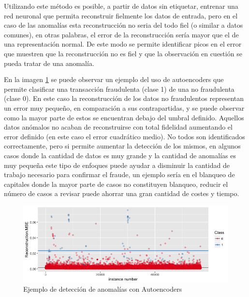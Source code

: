 Utilizando este método es posible, a partir de datos sin etiquetar, entrenar una red neuronal que permita reconstruir fielmente los datos de entrada, pero en el caso de las anomalías esta reconstrucción no seria del todo fiel (o similar a datos comunes), en otras palabras, el error de la reconstrucción sería mayor que el de una representación normal. De este modo se permite identificar picos en el error que muestren que la reconstrucción no es fiel y que la observación en cuestión se pueda tratar de una anomalía.

En la imagen \ref{fig:autoencoderAnomaly} se puede observar un ejemplo del uso de autoencoders que permite clasificar una transacción fraudulenta (clase 1) de una no fraudulenta (clase 0). En este caso la reconstrucción de los datos no fraudulentos representan un error muy pequeño, en comparación a sus contrapartidas, y se puede observar como la mayor parte de estos se encuentran debajo del umbral definido. Aquellos datos anómalos no acaban de reconstruirse con total fidelidad aumentando el error definido (en este caso el error cuadrático medio). No todos son identificados correctamente, pero si permite aumentar la detección de los mismos, en algunos casos donde la cantidad de datos es muy grande y la cantidad de anomalías es muy pequeña este tipo de enfoques puede ayudar a disminuir la cantidad de trabajo necesario para confirmar el fraude, un ejemplo sería en el blanqueo de capitales donde la mayor parte de casos no constituyen blanqueo, reducir el número de casos a revisar puede ahorrar una gran cantidad de costes y tiempo.

\begin{figure}[H]
    \centering
    \includegraphics[width=15cm]{figs/autoencoderAnomalyDetection.png}
    \caption{Ejemplo de detección de anomalías con Autoencoders}
    \label{fig:autoencoderAnomaly}
\end{figure}
